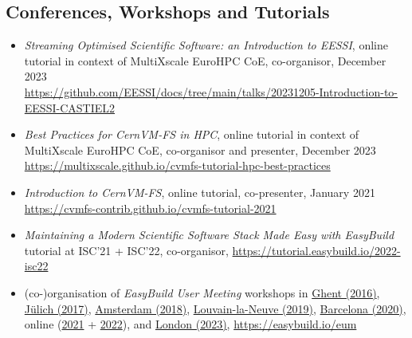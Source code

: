 \subsection*{Conferences, Workshops and Tutorials}

\begin{itemize}

\item[] \emph{Streaming Optimised Scientific Software: an Introduction to EESSI}, online tutorial in context of
    MultiXscale EuroHPC CoE, co-organisor, December 2023 
        \\{\small{\url{https://github.com/EESSI/docs/tree/main/talks/20231205-Introduction-to-EESSI-CASTIEL2}}}
\item[] \emph{Best Practices for CernVM-FS in HPC}, online tutorial in context of MultiXscale EuroHPC CoE, co-organisor
    and presenter, December 2023
        \\{\small{\url{https://multixscale.github.io/cvmfs-tutorial-hpc-best-practices}}}
\item[] \emph{Introduction to CernVM-FS}, online tutorial, co-presenter, January 2021
    \\{\small{\url{https://cvmfs-contrib.github.io/cvmfs-tutorial-2021}}}
\item[] \emph{Maintaining a Modern Scientific Software Stack Made Easy with EasyBuild} tutorial at ISC'21 + ISC'22,
    co-organisor, {\small{\url{https://tutorial.easybuild.io/2022-isc22}}}
\item[] (co-)organisation of \emph{EasyBuild User Meeting} workshops in
    \href{https://github.com/easybuilders/easybuild/wiki/1st-EasyBuild-User-Meeting}{Ghent (2016)},
        \href{https://github.com/easybuilders/easybuild/wiki/2nd-EasyBuild-User-Meeting}{J\"ulich (2017)},
        \href{https://github.com/easybuilders/easybuild/wiki/3rd-EasyBuild-User-Meeting}{Amsterdam (2018)},
        \href{https://github.com/easybuilders/easybuild/wiki/4th-EasyBuild-User-Meeting}{Louvain-la-Neuve (2019)},
        \href{https://github.com/easybuilders/easybuild/wiki/5th-EasyBuild-User-Meeting}{Barcelona (2020)},
        online (\href{https://easybuild.io/eum21}{2021} + \href{https://easybuild.io/eum22}{2022}),
        and \href{https://easybuild.io/eum23}{London (2023)},
        {\small{\url{https://easybuild.io/eum}}}


\end{itemize}
